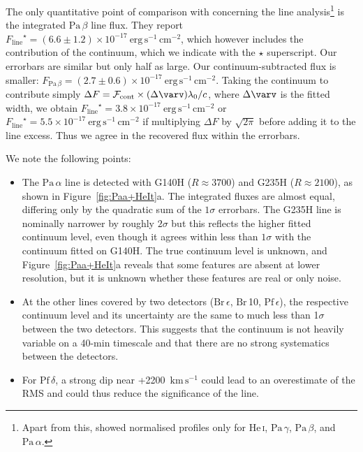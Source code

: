 \documentclass[twocolumn,twocolumnappendix]{aastex631}
\def\Paa{\ensuremath{\mathrm{Pa}\,\alpha}\xspace}           %
\def\Pab{\ensuremath{\mathrm{Pa}\,\beta}\xspace}            %
\def\Pag{\ensuremath{\mathrm{Pa}\,\gamma}\xspace}           %
\def\Bre{\ensuremath{\mathrm{Br}\,\epsilon}\xspace}         %
\def\Brz{\ensuremath{\mathrm{Br}}\,10\xspace}               %
\def\Pfd{\ensuremath{\mathrm{Pf}\,\delta}\xspace}           %
\def\Pfe{\ensuremath{\mathrm{Pf}\,\epsilon}\xspace}         %
\def\HeI{\ensuremath{\mathrm{He}}\,\textsc{i}\xspace}       %
\def\HeIt{\HeI}                     %
\def\FPab{\ensuremath{F_{\textrm{Pa}\,\beta}}\xspace}    %
\newcommand{\Fldichte}{\ensuremath{\mathcal{F}}\xspace} %
\def\FKont{\ensuremath{\Fldichte_{\textrm{cont}}}\xspace}       %
\def\FLinie{\ensuremath{F_{\textrm{line}}}\xspace}                %
\def\FLiniemitKont{\ensuremath{\FLinie^\star}\xspace}      %
\def\kms{\ensuremath{\textrm{km}\,\textrm{s}^{-1}}\xspace}    %
\def\FEcgs{\ensuremath{\textrm{erg}\,\textrm{s}^{-1}\,\textrm{cm}^{-2}}\xspace}
\begin{document}
The only quantitative point of comparison with \citet{luhman23c} concerning the line analysis\footnote{Apart from this, \citet{luhman23c} showed normalised profiles only for \HeIt, \Pag, \Pab, and \Paa.}
is the integrated \Pab line flux. They report $\FLiniemitKont=(6.6\pm1.2)\times10^{-17}~\FEcgs$, which however includes the contribution of the continuum, which we indicate with the $\star$ superscript. %
Our errorbars are similar but only half as large. %
%
Our continuum-subtracted flux is smaller: $\FPab=(2.7\pm0.6)\times10^{-17}~\FEcgs$.
Taking the continuum to contribute simply $\Delta F=\FKont\times(\Delta \varv)\lambda_0/c$, where $\Delta \varv$ is the fitted width, we obtain 
%
%
%
%
$\FLiniemitKont=3.8\times10^{-17}~\FEcgs$
%
%
%
or $\FLiniemitKont=5.5\times10^{-17}~\FEcgs$ 
if multiplying $\Delta F$ by $\sqrt{2\pi}$ before adding it to the line excess.  %
Thus we agree in the recovered flux within the errorbars.


We note the following points:
\begin{itemize}
  \item 
The \Paa line is detected with G140H ($R\approx3700$) and G235H ($R\approx2100$), as shown in Figure~\ref{fig:Paa+HeIt}a. The integrated fluxes are almost equal, differing only by the quadratic sum of the $1\sigma$ errorbars. The G235H line is nominally narrower by roughly $2\sigma$ but this reflects the higher fitted continuum level, even though it agrees within less than $1\sigma$ with the continuum fitted on G140H. The true continuum level is unknown, and Figure~\ref{fig:Paa+HeIt}a reveals that some features are absent at lower resolution, but it is unknown whether these features are real or only noise.
%
%
%
%

  \item
At the other lines covered by two detectors (\Bre, \Brz, \Pfe), the respective continuum level and its uncertainty are the same to much less than 1$\sigma$ between the two detectors. This suggests that the continuum is not heavily variable on a 40-min timescale and that there are no strong systematics between the detectors.

%
%
%
%
%
%

%
%


%
%
%

  \item 
For \Pfd, a strong dip near +2200~\kms could lead to an overestimate of the RMS
and could thus reduce the significance of the line.  %

\end{itemize}
\end{document}

